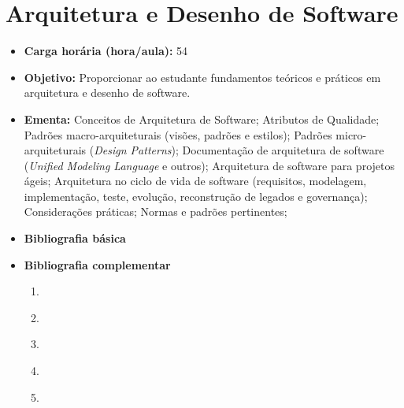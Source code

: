 \documentclass[11pt,fleqn]{book} %
\begin{document}
\section{Arquitetura e Desenho de Software}\label{2_arqsoft}
\begin{itemize}
	\item \textbf{Carga horária (hora/aula):} 54
	\item \textbf{Objetivo:} Proporcionar ao estudante fundamentos teóricos e práticos em arquitetura e desenho de software.
	\item \textbf{Ementa:} 
	Conceitos de Arquitetura de Software;
	Atributos de Qualidade;
	Padrões macro-arquiteturais (visões, padrões e estilos);
	Padrões micro-arquiteturais (\textit{Design Patterns});
	Documentação de arquitetura de software (\textit{Unified Modeling Language} e outros);
	Arquitetura de software para projetos ágeis;
	Arquitetura no ciclo de vida de software (requisitos, modelagem, implementação, teste, evolução, reconstrução de legados e governança);
	Considerações práticas;
	Normas e padrões pertinentes;
	\item \textbf{Bibliografia básica}
	\item \textbf{Bibliografia complementar}
	\begin{enumerate}
		\item \cite{sommerville2011engenharia}
		\item \cite{wazlawick2011analise}
		\item \cite{fowler_tortello_2005}
		\item \cite{teruel_2012}
		\item \cite{gamma_helm_johnson_vlissides_2000}
	\end{enumerate}
\end{itemize}


\newpage
\end{document}
